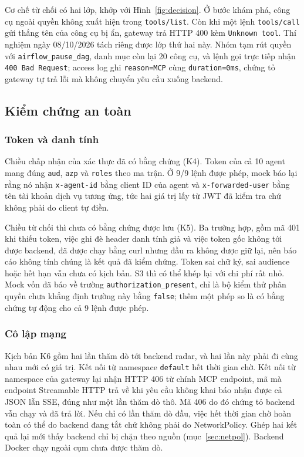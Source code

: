 \documentclass[a4paper]{article}
\begin{document}
Cơ chế từ chối có hai lớp, khớp với Hình~\ref{fig:decision}. Ở bước khám phá, công cụ ngoài quyền không xuất hiện trong \texttt{tools/list}. Còn khi một lệnh \texttt{tools/call} gửi thẳng tên của công cụ bị ẩn, gateway trả HTTP 400 kèm \texttt{Unknown tool}. Thí nghiệm ngày 08/10/2026 tách riêng được lớp thứ hai này. Nhóm tạm rút quyền với \texttt{airflow\_pause\_dag}, danh mục còn lại 20 công cụ, và lệnh gọi trực tiếp nhận \texttt{400 Bad Request}; access log ghi \texttt{reason=MCP} cùng \texttt{duration=0ms}, chứng tỏ gateway tự trả lỗi mà không chuyển yêu cầu xuống backend.

\subsection{Kiểm chứng an toàn}

\subsubsection{Token và danh tính}

Chiều chấp nhận của xác thực đã có bằng chứng (K4). Token của cả 10 agent mang đúng \texttt{aud}, \texttt{azp} và \texttt{roles} theo ma trận. Ở 9/9 lệnh được phép, mock báo lại rằng nó nhận \texttt{x-agent-id} bằng client ID của agent và \texttt{x-forwarded-user} bằng tên tài khoản dịch vụ tương ứng, tức hai giá trị lấy từ JWT đã kiểm tra chứ không phải do client tự điền.

Chiều từ chối thì chưa có bằng chứng được lưu (K5). Ba trường hợp, gồm mã 401 khi thiếu token, việc ghi đè header danh tính giả và việc token gốc không tới được backend, đã được chạy bằng curl nhưng đầu ra không được giữ lại, nên báo cáo không tính chúng là kết quả đã kiểm chứng. Token sai chữ ký, sai audience hoặc hết hạn vẫn chưa có kịch bản. S3 thì có thể khép lại với chi phí rất nhỏ. Mock vốn đã báo về trường \texttt{authorization\_present}, chỉ là bộ kiểm thử phân quyền chưa khẳng định trường này bằng \texttt{false}; thêm một phép so là có bằng chứng tự động cho cả 9 lệnh được phép.

\subsubsection{Cô lập mạng}

Kịch bản K6 gồm hai lần thăm dò tới backend radar, và hai lần này phải đi cùng nhau mới có giá trị. Kết nối từ namespace \texttt{default} hết thời gian chờ. Kết nối từ namespace của gateway lại nhận HTTP 406 từ chính MCP endpoint, mã mà endpoint Streamable HTTP trả về khi yêu cầu không khai báo nhận được cả JSON lẫn SSE, đúng như một lần thăm dò thô. Mã 406 do đó chứng tỏ backend vẫn chạy và đã trả lời. Nếu chỉ có lần thăm dò đầu, việc hết thời gian chờ hoàn toàn có thể do backend đang tắt chứ không phải do NetworkPolicy. Ghép hai kết quả lại mới thấy backend chỉ bị chặn theo nguồn (mục~\ref{sec:netpol}). Backend Docker chạy ngoài cụm chưa được thăm dò.
\end{document}
